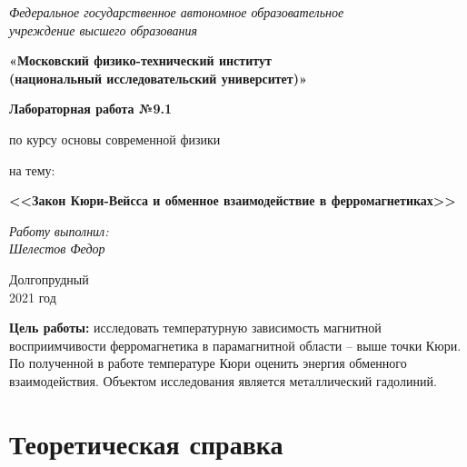 \documentclass[a4paper, 12pt]{article}%
\begin{document}
 
		\begin{titlepage}
			\begin{center}
				\textit{Федеральное государственное автономное образовательное\\ учреждение высшего образования }
				\vspace{0.5ex}
				
				\textbf{«Московский физико-технический институт\\ (национальный исследовательский университет)»}
			\end{center}
			\vspace{10ex}
			\begin{center}
				\vspace{13ex}
				\textbf{Лабораторная работа №9.1}
				\vspace{1ex}
				
				по курсу основы современной физики
				
				
				на тему:
				
				\textbf{\large{<<Закон Кюри-Вейсса и обменное взаимодействие в ферромагнетиках>>}}
				
				\vspace{30ex}
				\begin{flushright}
					\noindent
					\textit{Работу выполнил:}
					\\
					\textit{Шелестов Федор
					}						 
				\end{flushright}
				\vfill
				Долгопрудный \\2021 год
			\end{center}
		\end{titlepage}
	
				\newpage
		
	
	\pagestyle{fancy}
	

\textbf{Цель работы:} исследовать температурную зависимость магнитной восприимчивости ферромагнетика в парамагнитной области -- выше точки Кюри. По полученной в работе температуре Кюри оценить энергия обменного взаимодействия. Объектом исследования является металлический гадолиний.

\section{Теоретическая справка}
\end{document}
